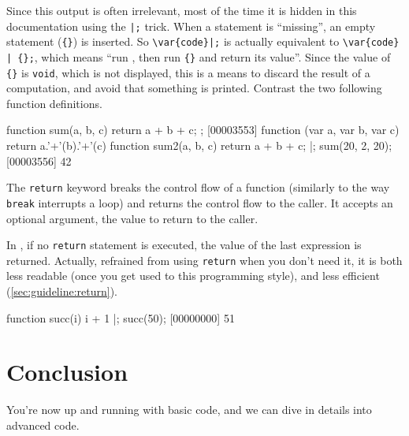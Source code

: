 Since this output is often irrelevant, most of the time it is hidden in this
documentation using the \lstinline'|;' trick.  When a statement is
``missing'', an empty statement (\lstinline|{}|) is inserted.  So
\lstinline'\var{code}|;' is actually equivalent to
\lstinline'\var{code} | {};', which means ``run , then run
\lstinline'{}' and return its value''.  Since the value of \lstinline'{}' is
\lstinline'void', which is not displayed, this is a means to discard the
result of a computation, and avoid that something is printed.  Contrast the
two following function definitions.

\begin{urbiscript}
function sum(a, b, c)
{
  return a + b + c;
};
[00003553] function (var a, var b, var c) { return a.'+'(b).'+'(c) }
function sum2(a, b, c)
{
  return a + b + c;
}|;
sum(20, 2, 20);
[00003556] 42
\end{urbiscript}

The \lstinline{return} keyword breaks the control flow of a function
(similarly to the way \lstinline{break} interrupts a loop) and returns the
control flow to the caller.  It accepts an optional argument, the value to
return to the caller.

In \us, if no \lstinline{return} statement is executed, the value of the
last expression is returned.  Actually, refrained from using
\lstinline{return} when you don't need it, it is both less readable (once
you get used to this programming style), and less efficient
(\autoref{sec:guideline:return}).

\begin{urbiscript}
function succ(i) { i + 1 }|;
succ(50);
[00000000] 51
\end{urbiscript}

\section{Conclusion}

You're now up and running with basic \us code, and we can dive in
details into advanced \us code.

